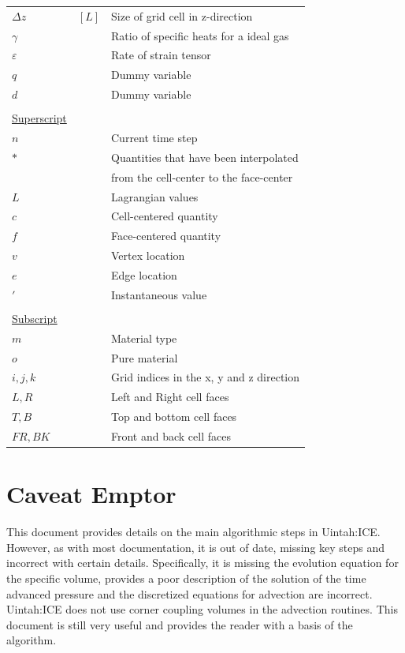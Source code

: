\documentclass[fleqn]{article}
\begin{document}
\begin{tabular}{lll}
$\Delta{z}$   &  $[L]$      &    Size of grid cell in z-direction\\
$\gamma$      &             &    Ratio of specific heats for a ideal gas\\
$\varepsilon$ &             &    Rate of strain tensor\\
$q$           &             &    Dummy variable       \\
$d$           &             &    Dummy variable       \\
\\
\textsf{\underline{Superscript}}\\
$n$           &             &    Current time step\\
$*$           &             &    Quantities that have been interpolated \\
              &             &    from the cell-center to the face-center\\
$L$           &             &    Lagrangian values\\
$c$           &             &    Cell-centered quantity\\
$f$           &             &    Face-centered quantity\\
$v$           &             &    Vertex location\\
$e$           &             &    Edge location\\
$\prime$      &             &    Instantaneous value\\
\\
\textsf{\underline{Subscript}}\\
$m$           &             &    Material type\\
$o$           &             &    Pure material\\
$i, j, k$     &             &    Grid indices in the x, y and z direction\\
$L, R $       &             &    Left and Right cell faces\\
$T, B $       &             &    Top and bottom cell faces\\
$FR, BK$      &             &    Front and back cell faces
\\
\end{tabular}
\newpage
\section{\textsf{Caveat Emptor}}
\label{sec-overview}
This document provides details on the main algorithmic steps in Uintah:ICE.
However, as with most documentation, it is out of date, missing key steps and
incorrect with certain details.  Specifically, it is missing the evolution
equation for the specific volume, provides a poor description of the solution
of the time advanced pressure and the discretized equations for advection
are incorrect.  Uintah:ICE does not use corner coupling volumes in the
advection routines.  This document is still very useful and provides the
reader with a basis of the algorithm.
\newpage
 
\end{document}
